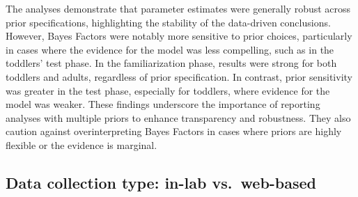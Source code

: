 \documentclass[
  man, donotrepeattitle,floatsintext]{apa6}
\begin{document}
The analyses demonstrate that parameter estimates were generally robust across prior specifications, highlighting the stability of the data-driven conclusions. However, Bayes Factors were notably more sensitive to prior choices, particularly in cases where the evidence for the model was less compelling, such as in the toddlers' test phase. In the familiarization phase, results were strong for both toddlers and adults, regardless of prior specification. In contrast, prior sensitivity was greater in the test phase, especially for toddlers, where evidence for the model was weaker. These findings underscore the importance of reporting analyses with multiple priors to enhance transparency and robustness. They also caution against overinterpreting Bayes Factors in cases where priors are highly flexible or the evidence is marginal.

\begin{table}
\centering
\caption{\label{tab:unnamed-chunk-2}Summary of Bayesian Results Across Phases and Priors.}
\centering
{}
\end{table}

\subsection{Data collection type: in-lab vs.~web-based}\label{data-collection-type-in-lab-vs.-web-based}
\end{document}
